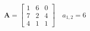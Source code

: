 \documentclass[12 pt]{slides}
\begin{document}
\begingroup
\[\textbf{A} = \begin{bmatrix}1 & 6 & 0\\7 & 2 & 4\\4 & 1 & 1\end{bmatrix}
	\quad a_{1, 2} = 6\]
\endgroup
\end{document}

